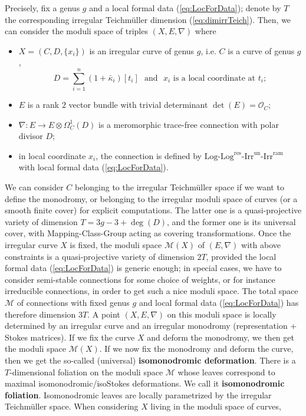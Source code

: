 \documentclass[12]{amsart}
\newcommand{\Log}{\boldsymbol{\mathrm{Log}}}
\newcommand{\Logres}{\boldsymbol{\mathrm{Log}^{\mathrm{res}}}}
\newcommand{\Irrun}{\boldsymbol{\mathrm{Irr}^{\mathrm{un}}}}
\newcommand{\Irram}{\boldsymbol{\mathrm{Irr}^{\mathrm{ram}}}}
\begin{document}
Precisely, fix a genus $g$ and 
a local formal data (\ref{eq:LocForData}); denote by $T$ the corresponding irregular Teichm\"uller dimension
(\ref{eq:dimirrTeich}). Then, we can consider the moduli space of triples $(X,E,\nabla)$ where 
\begin{itemize}
\item $X=(C,D,\{x_i\})$ is an irregular curve of genus $g$, i.e. $C$ is a curve of genus $g$,
$$D=\sum_{i=1}^n(1+\bar\kappa_i)[t_i]\ \ \ \text{and}\ \ \ x_i\text{ is a local coordinate at }t_i;$$
\item $E$ is a rank $2$ vector bundle with trivial determinant $\det(E)=\mathcal O_C$;
\item $\nabla:E\to E\otimes\Omega^1_C(D)$ is a meromorphic trace-free connection with polar divisor $D$;
\item in local coordinate $x_i$, the connection is defined by $\Log$-$\Logres$-$\Irrun$-$\Irram$ with local formal data (\ref{eq:LocForData}).
\end{itemize}
We can consider $C$ belonging to the irregular Teichm\"uller space if we want to define the monodromy, or
belonging to the irregular moduli space of curves (or a smooth finite cover) for explicit computations.
The latter one is a quasi-projective variety of dimension $T=3g-3+\deg(D)$, and the former one 
is its universal cover, with Mapping-Class-Group acting as covering transformations.
Once the irregular curve $X$ is fixed, the moduli space $\mathcal M(X)$ of $(E,\nabla)$ with above constraints
is a quasi-projective variety of dimension $2T$, provided the local formal data (\ref{eq:LocForData})
is generic enough; in special cases, we have to consider semi-stable connections for some choice of 
weights, or for instance irreducible connections, in order to get such a nice moduli space. The total space 
$\mathcal M$ of connections with fixed genus $g$ and local formal data (\ref{eq:LocForData}) has therefore 
dimension $3T$. A point $(X,E,\nabla)$ on this moduli space is locally determined by an irregular curve 
and an irregular monodromy (representation + Stokes matrices).
If we fix the curve $X$ and deform the monodromy, we then get the moduli space $\mathcal M(X)$.
If we now fix the monodromy and deform the curve, then we get the so-called (universal) {\bf isomonodromic deformation}.
There is a $T$-dimensional foliation on the moduli space $\mathcal M$ whose leaves
correspond to maximal isomonodromic/isoStokes deformations. We call it {\bf isomonodromic foliation}.
Isomonodromic leaves are locally parametrized 
by the irregular Teichm\"uller space. When considering $X$ living in the moduli space of curves, 
\end{document}
